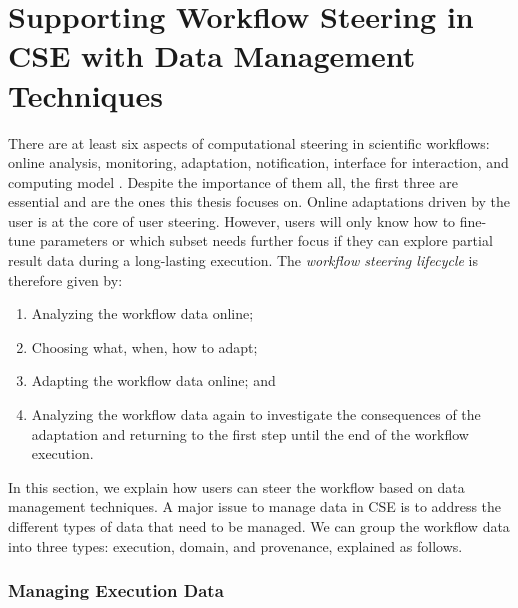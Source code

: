 \section{Supporting Workflow Steering in CSE with Data Management Techniques}
\label{section_workflow_steering_db}

There are at least six aspects of computational steering in scientific workflows: online analysis, monitoring, adaptation, notification, interface for interaction, and computing model \cite{Mattoso2015Dynamic}. Despite the importance of them all, the first three are essential and are the ones this thesis focuses on.
Online adaptations driven by the user is at the core of user steering.
 However, users will only know how to fine-tune parameters or which subset needs further focus if they can explore partial result data during a long-lasting execution.  The \textit{workflow steering lifecycle} is therefore given by:

 \begin{enumerate}[label=(\roman*),itemsep=0pt]
    \item Analyzing the workflow data online;
    \item Choosing what, when, how to adapt; 
    \item Adapting the workflow data online; and
    \item Analyzing the workflow data again to investigate the consequences of the adaptation and returning to the first step until the end of the workflow execution.
 \end{enumerate}

In this section, we explain how users can steer the workflow based on data management techniques.
A major issue to manage data in CSE is to address the different types of data that need to be managed.
We can group the workflow data into three types: execution,
domain, and provenance, explained as follows.


\subsubsection{Managing Execution Data}

